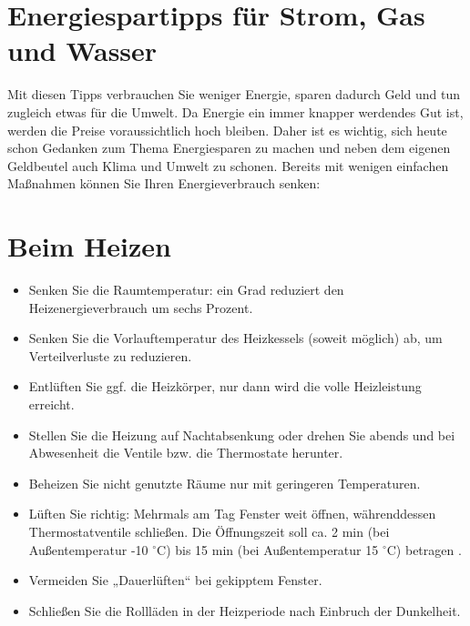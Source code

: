 \documentclass{scrartcl}
\begin{document}
\section*{Energiespartipps für Strom, Gas und Wasser}
Mit diesen Tipps verbrauchen Sie weniger Energie, sparen dadurch Geld und tun zugleich etwas für die Umwelt. Da Energie ein immer knapper werdendes Gut ist, werden die Preise voraussichtlich hoch bleiben. Daher ist es wichtig, sich heute schon Gedanken zum Thema Energiesparen zu machen und neben dem eigenen Geldbeutel auch Klima und Umwelt zu schonen. Bereits mit wenigen einfachen Maßnahmen können Sie Ihren Energieverbrauch senken:\\

\section*{Beim Heizen}
\begin{itemize}
\item Senken Sie die Raumtemperatur: ein Grad reduziert den Heizenergieverbrauch um sechs Prozent.
\item Senken Sie die Vorlauftemperatur des Heizkessels (soweit möglich) ab, um Verteilverluste zu reduzieren.
\item Entlüften Sie ggf. die Heizkörper, nur dann wird die volle Heizleistung erreicht.
\item Stellen Sie die Heizung auf Nachtabsenkung oder drehen Sie abends und bei Abwesenheit die Ventile bzw. die Thermostate herunter.
\item Beheizen Sie nicht genutzte Räume nur mit geringeren Temperaturen.
\item Lüften Sie richtig: Mehrmals am Tag Fenster weit öffnen, währenddessen Thermostatventile schließen. Die Öffnungszeit soll ca. 2 min (bei Außentemperatur -10 $^{\circ}$C) bis 15 min (bei Außentemperatur 15 $^{\circ}$C) betragen \cite{griesshammer2008}.
\item Vermeiden Sie „Dauerlüften“ bei gekipptem Fenster.
\item Schließen Sie die Rollläden in der Heizperiode nach Einbruch der Dunkelheit.
\end{itemize}
\end{document}

